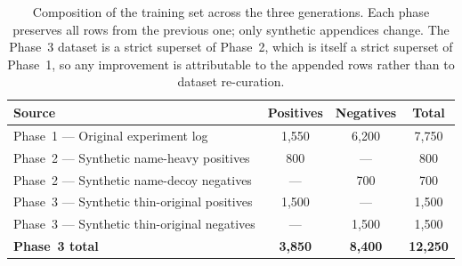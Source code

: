 \begin{table}[H]
\centering
\caption{Composition of the training set across the three generations. Each phase preserves all rows from the previous one; only synthetic appendices change. The Phase~3 dataset is a strict superset of Phase~2, which is itself a strict superset of Phase~1, so any improvement is attributable to the appended rows rather than to dataset re-curation.}
\label{tab:augmentation_dataset}
\begin{tabular}{lccc}
\toprule
Source & Positives & Negatives & Total \\
\midrule
Phase~1 — Original experiment log         & 1{,}550 & 6{,}200 & 7{,}750 \\
Phase~2 — Synthetic name-heavy positives  & 800     & ---     & 800 \\
Phase~2 — Synthetic name-decoy negatives  & ---     & 700     & 700 \\
Phase~3 — Synthetic thin-original positives  & 1{,}500 & ---     & 1{,}500 \\
Phase~3 — Synthetic thin-original negatives  & ---     & 1{,}500 & 1{,}500 \\
\midrule
\textbf{Phase~3 total} & \textbf{3{,}850} & \textbf{8{,}400} & \textbf{12{,}250} \\
\bottomrule
\end{tabular}
\end{table}
